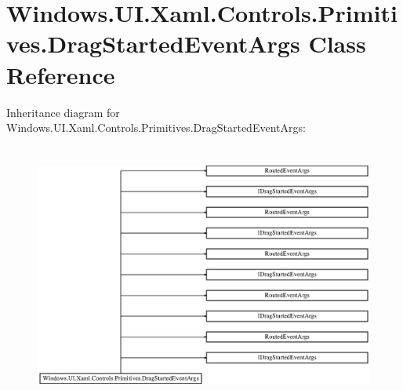 \hypertarget{class_windows_1_1_u_i_1_1_xaml_1_1_controls_1_1_primitives_1_1_drag_started_event_args}{}\section{Windows.\+U\+I.\+Xaml.\+Controls.\+Primitives.\+Drag\+Started\+Event\+Args Class Reference}
\label{class_windows_1_1_u_i_1_1_xaml_1_1_controls_1_1_primitives_1_1_drag_started_event_args}
Inheritance diagram for Windows.\+U\+I.\+Xaml.\+Controls.\+Primitives.\+Drag\+Started\+Event\+Args\+:\begin{figure}[H]
\begin{center}
\leavevmode
\includegraphics[height=8.627451cm]{class_windows_1_1_u_i_1_1_xaml_1_1_controls_1_1_primitives_1_1_drag_started_event_args}
\end{center}
\end{figure}
